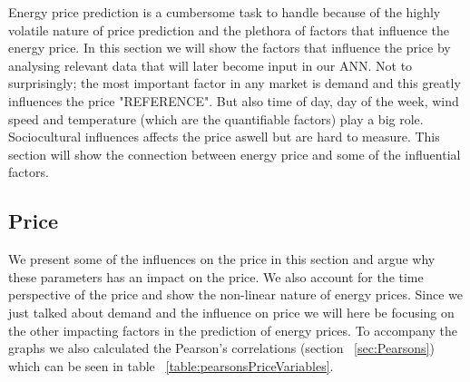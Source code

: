 Energy price prediction is a cumbersome task to handle because of the highly volatile nature of price prediction and the plethora of factors that influence the energy price. In this section we will show the factors that influence the price by analysing relevant data that will later become input in our ANN. Not to surprisingly; the most important factor in any market is demand and this greatly influences the price "REFERENCE". But also time of day, day of the week, wind speed and temperature (which are the quantifiable factors) play a big role. Sociocultural influences affects the price aswell but are hard to measure. This section will show the connection between energy price and some of the influential factors.



\subsection{Price}
We present some of the influences on the price in this section and argue why these parameters has an impact on the price. We also account for the time perspective of the price and show the non-linear nature of energy prices. Since we just talked about demand and the influence on price we will here be focusing on the other impacting factors in the prediction of energy prices. To accompany the graphs we also calculated the Pearson's correlations (section ~\ref{sec:Pearsons}) which can be seen in table ~\ref{table:pearsonsPriceVariables}.

